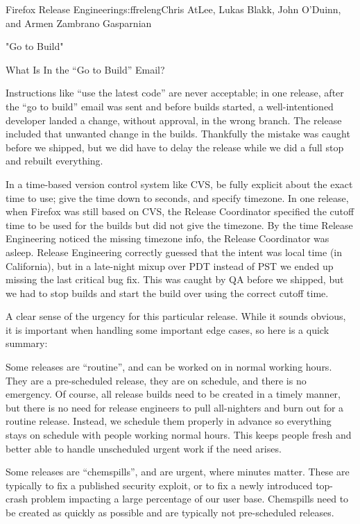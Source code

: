 \begin{aosachapter}{Firefox Release Engineering}{s:ffreleng}{Chris AtLee, Lukas Blakk, John O'Duinn, and Armen Zambrano Gasparnian}
\begin{aosasect1}{"Go to Build"}
\begin{aosasect2}{What Is In the ``Go to Build'' Email?}
\begin{aosaenumerate}
\begin{aosaenumerate2}
    \item Instructions like ``use the latest code'' are never acceptable; in one
      release, after the ``go to build'' email was sent and before
      builds started, a well-intentioned developer landed a change,
      without approval, in the wrong branch. The release included that
      unwanted change in the builds. Thankfully the mistake was
      caught before we shipped, but we did have to delay the release 
      while we did a full stop and rebuilt everything.

    \item In a time-based version control system like CVS, be fully
      explicit about the exact time to use; give the time down to seconds,
      and specify timezone. In one release, when Firefox was still
      based on CVS, the Release Coordinator specified the cutoff time
      to be used for the builds but did not give the timezone. By the
      time Release Engineering noticed the missing timezone info, the
      Release Coordinator was asleep. Release
      Engineering correctly guessed that the intent was local time (in
      California), but in a late-night mixup over PDT instead of PST
      we ended up missing the last critical bug fix. This was caught
      by QA before we shipped, but we had to stop builds and
      start the build over using the correct cutoff time.

    \end{aosaenumerate2}

\item A clear sense of the urgency for this particular release.  While
  it sounds obvious, it is important when handling some important edge
  cases, so here is a quick summary:

  \begin{aosaenumerate2}

    \item Some releases are ``routine'', and can be worked on in
      normal working hours. They are a pre-scheduled release, they are
      on schedule, and there is no emergency. Of course, all release
      builds need to be created in a timely manner, but there is no
      need for release engineers to pull all-nighters and burn out
      for a routine release.  Instead, we schedule them
      properly in advance so everything stays on schedule with people
      working normal hours. This keeps people fresh and better able to
      handle unscheduled urgent work if the need arises.

    \item Some releases are ``chemspills'', and are urgent, where minutes matter. These are
      typically to fix a published security exploit, or to fix a
      newly introduced top-crash problem impacting a large percentage
      of our user base. Chemspills need to be created as
      quickly as possible and are typically not pre-scheduled
      releases.


\end{aosaenumerate2}
\end{aosaenumerate}
\end{aosasect2}
\end{aosasect1}
\end{aosachapter}
